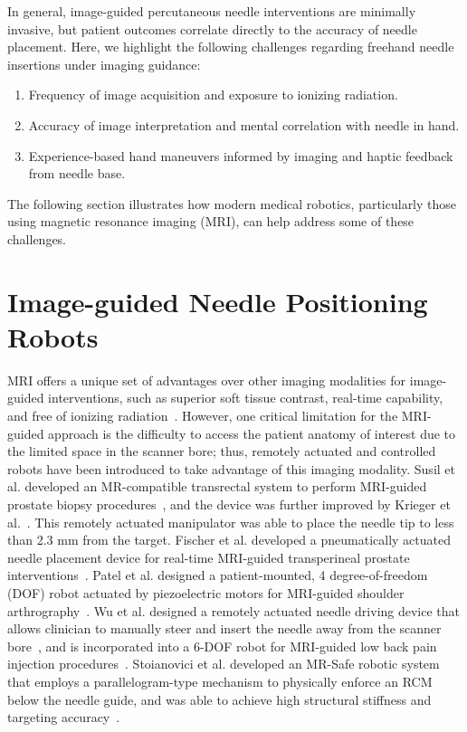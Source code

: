 In general, image-guided percutaneous needle interventions are minimally invasive, but patient outcomes correlate directly to the accuracy of needle placement. Here, we highlight the following challenges regarding freehand needle insertions under imaging guidance:
\begin{enumerate}
\item Frequency of image acquisition and exposure to ionizing radiation.
\item Accuracy of image interpretation and mental correlation with needle in hand.
\item Experience-based hand maneuvers informed by imaging and haptic feedback from needle base.
\end{enumerate}

The following section illustrates how modern medical robotics, particularly those using magnetic resonance imaging (MRI), can help address some of these challenges.

\section{Image-guided Needle Positioning Robots}
\label{sec:image-guided-needle-positioning-robots}

MRI offers a unique set of advantages over other imaging modalities for image-guided interventions, such as superior soft tissue contrast, real-time capability, and free of ionizing radiation~\parencite{tsekosMagneticResonanceCompatible2007}. However, one critical limitation for the MRI-guided approach is the difficulty to access the patient anatomy of interest due to the limited space in the scanner bore; thus, remotely actuated and controlled robots have been introduced to take advantage of this imaging modality. Susil et al. developed an MR-compatible transrectal system to perform MRI-guided prostate biopsy procedures~\parencite{susilSystemMRImage2003, susilSystemProstateBrachytherapy2004}, and the device was further improved by Krieger et al.~\parencite{kriegerDesignNovelMRI2005}. This remotely actuated manipulator was able to place the needle tip to less than 2.3 mm from the target. Fischer et al. developed a pneumatically actuated needle placement device for real-time MRI-guided  transperineal prostate interventions~\parencite{fischerMRICompatiblePneumaticRobot2008}. Patel et al. designed a patient-mounted, 4 degree-of-freedom (DOF) robot actuated by piezoelectric motors for MRI-guided shoulder arthrography~\parencite{patelRoboticSystemMRIGuided2018}. Wu et al. designed a remotely actuated needle driving device that allows clinician to manually steer and insert the needle away from the scanner bore~\parencite{wuRemotelyActuatedNeedle2019}, and is incorporated into a 6-DOF robot for MRI-guided low back pain injection procedures~\parencite{liFullyActuatedBodyMounted2020a}. Stoianovici et al. developed an MR-Safe robotic system that employs a parallelogram-type mechanism to physically enforce an RCM below the needle guide, and was able to achieve high structural stiffness and targeting accuracy~\parencite{stoianoviciMultiImagerCompatibleMR2018}. 

